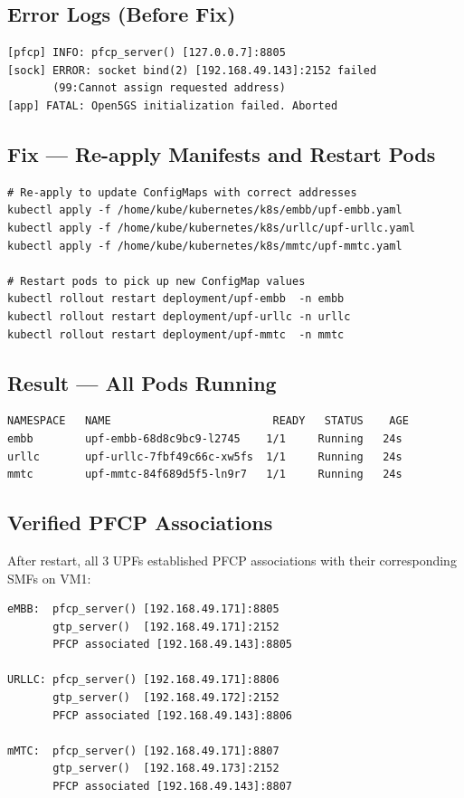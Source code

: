 \documentclass[12pt,a4paper]{article}
\begin{document}
\subsection{Error Logs (Before Fix)}

\begin{lstlisting}[style=terminal]
[pfcp] INFO: pfcp_server() [127.0.0.7]:8805
[sock] ERROR: socket bind(2) [192.168.49.143]:2152 failed
       (99:Cannot assign requested address)
[app] FATAL: Open5GS initialization failed. Aborted
\end{lstlisting}

\subsection{Fix — Re-apply Manifests and Restart Pods}

\begin{lstlisting}[style=terminal]
# Re-apply to update ConfigMaps with correct addresses
kubectl apply -f /home/kube/kubernetes/k8s/embb/upf-embb.yaml
kubectl apply -f /home/kube/kubernetes/k8s/urllc/upf-urllc.yaml
kubectl apply -f /home/kube/kubernetes/k8s/mmtc/upf-mmtc.yaml

# Restart pods to pick up new ConfigMap values
kubectl rollout restart deployment/upf-embb  -n embb
kubectl rollout restart deployment/upf-urllc -n urllc
kubectl rollout restart deployment/upf-mmtc  -n mmtc
\end{lstlisting}

\subsection{Result — All Pods Running}

\begin{lstlisting}[style=terminal]
NAMESPACE   NAME                         READY   STATUS    AGE
embb        upf-embb-68d8c9bc9-l2745    1/1     Running   24s
urllc       upf-urllc-7fbf49c66c-xw5fs  1/1     Running   24s
mmtc        upf-mmtc-84f689d5f5-ln9r7   1/1     Running   24s
\end{lstlisting}

\subsection{Verified PFCP Associations}

After restart, all 3 UPFs established PFCP associations with their corresponding SMFs on VM1:

\begin{lstlisting}[style=terminal]
eMBB:  pfcp_server() [192.168.49.171]:8805
       gtp_server()  [192.168.49.171]:2152
       PFCP associated [192.168.49.143]:8805

URLLC: pfcp_server() [192.168.49.171]:8806
       gtp_server()  [192.168.49.172]:2152
       PFCP associated [192.168.49.143]:8806

mMTC:  pfcp_server() [192.168.49.171]:8807
       gtp_server()  [192.168.49.173]:2152
       PFCP associated [192.168.49.143]:8807
\end{lstlisting}
\end{document}
